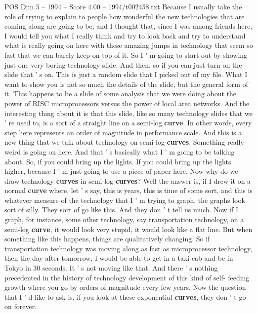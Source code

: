 \begin{textsample}{POS Dim 5 – 1994 – Score 4.00 – 1994/t002458.txt}  \label{ex:f5_pos_006}
Because I usually take the role of trying to explain to people how wonderful the new technologies that are coming along are going to be, and I thought that, since I was among friends here, I would tell you what I really think and try to look back and try to understand what is really going on here with these amazing jumps in technology that seem so fast that we can barely keep on top of it.
So I ' m going to start out by showing just one very boring technology slide.
And then, so if you can just turn on the slide that ' s on.
This is just a random slide that I picked out of my file.
What I want to show you is not so much the details of the slide, but the general form of it.
This happens to be a slide of some analysis that we were doing about the power of RISC microprocessors versus the power of local area networks.
And the interesting thing about it is that this slide, like so many technology slides that we ' re used to, is a sort of a straight line on a semi-log \textbf{curve}.
In other words, every step here represents an order of magnitude in performance scale.
And this is a new thing that we talk about technology on semi-log \textbf{curves}.
Something really weird is going on here.
And that ' s basically what I ' m going to be talking about.
So, if you could bring up the lights.
If you could bring up the lights higher, because I ' m just going to use a piece of paper here.
Now why do we draw technology \textbf{curves} in semi-log \textbf{curves}?
Well the answer is, if I drew it on a normal \textbf{curve} where, let ' s say, this is years, this is time of some sort, and this is whatever measure of the technology that I ' m trying to graph, the graphs look sort of silly.
They sort of go like this.
And they don ' t tell us much.
Now if I graph, for instance, some other technology, say transportation technology, on a semi-log \textbf{curve}, it would look very stupid, it would look like a flat line.
But when something like this happens, things are qualitatively changing.
So if transportation technology was moving along as fast as microprocessor technology, then the day after tomorrow, I would be able to get in a taxi cab and be in Tokyo in 30 seconds.
It ' s not moving like that.
And there ' s nothing precedented in the history of technology development of this kind of self- feeding growth where you go by orders of magnitude every few years.
Now the question that I ' d like to ask is, if you look at these exponential \textbf{curves}, they don ' t go on forever.

\end{textsample}
